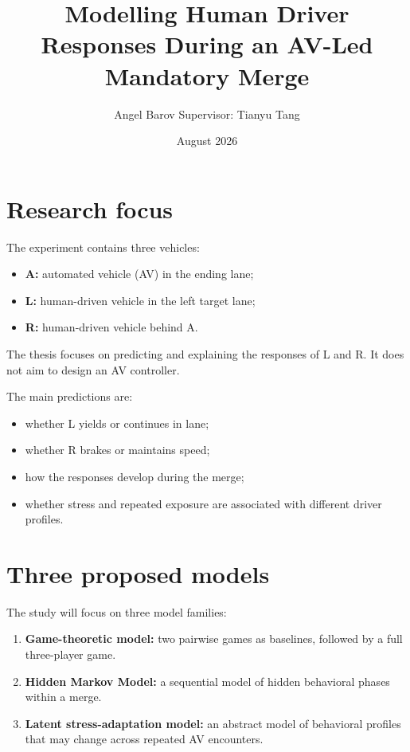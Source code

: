 \documentclass[11pt,a4paper]{article}
\title{Modelling Human Driver Responses During an AV-Led Mandatory Merge}
\author{Angel Barov \quad Supervisor: Tianyu Tang}
\date{August 2026}
\begin{document}
\maketitle

\section{Research focus}

The experiment contains three vehicles:

\begin{itemize}[noitemsep]
  \item \textbf{A:} automated vehicle (AV) in the ending lane;
  \item \textbf{L:} human-driven vehicle in the left target lane;
  \item \textbf{R:} human-driven vehicle behind A.
\end{itemize}

The thesis focuses on predicting and explaining the responses of L and R. It does not aim to design an AV controller.

The main predictions are:

\begin{itemize}[noitemsep]
  \item whether L yields or continues in lane;
  \item whether R brakes or maintains speed;
  \item how the responses develop during the merge;
  \item whether stress and repeated exposure are associated with different driver profiles.
\end{itemize}

\section{Three proposed models}

The study will focus on three model families:

\begin{enumerate}
  \item \textbf{Game-theoretic model:} two pairwise games as baselines, followed by a full three-player game.
  \item \textbf{Hidden Markov Model:} a sequential model of hidden behavioral phases within a merge.
  \item \textbf{Latent stress-adaptation model:} an abstract model of behavioral profiles that may change across repeated AV encounters.
\end{enumerate}
\end{document}
